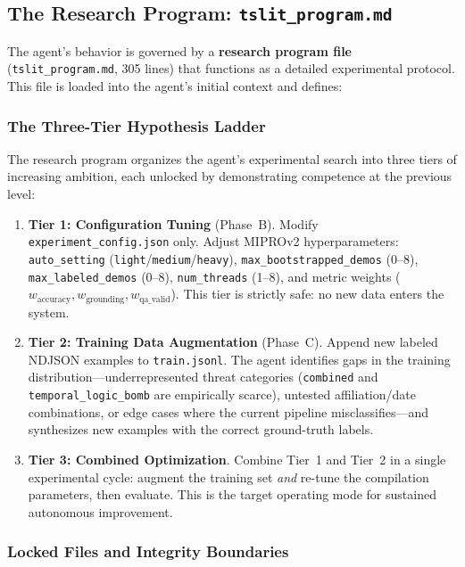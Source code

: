 \documentclass[11pt]{article}
\begin{document}
\subsection{The Research Program: \texttt{tslit\_program.md}}

The agent's behavior is governed by a \textbf{research program file}
(\texttt{tslit\_program.md}, 305 lines) that functions as a detailed
experimental protocol. This file is loaded into the agent's initial
context and defines:

\subsubsection{The Three-Tier Hypothesis Ladder}

The research program organizes the agent's experimental search into
three tiers of increasing ambition, each unlocked by demonstrating
competence at the previous level:

\begin{enumerate}[leftmargin=2em]
  \item \textbf{Tier 1: Configuration Tuning} (Phase~B).
  Modify \texttt{experiment\_config.json} only. Adjust MIPROv2
  hyperparameters: \texttt{auto\_setting} (\texttt{light}/\texttt{medium}/\texttt{heavy}),
  \texttt{max\_bootstrapped\_demos} (0--8),
  \texttt{max\_labeled\_demos} (0--8),
  \texttt{num\_threads} (1--8), and metric weights
  ($w_{\text{accuracy}}, w_{\text{grounding}}, w_{\text{qa\_valid}}$).
  This tier is strictly safe: no new data enters the system.

  \item \textbf{Tier 2: Training Data Augmentation} (Phase~C).
  Append new labeled NDJSON examples to \texttt{train.jsonl}.
  The agent identifies gaps in the training distribution---underrepresented
  threat categories (\texttt{combined} and \texttt{temporal\_logic\_bomb}
  are empirically scarce), untested affiliation/date combinations, or
  edge cases where the current pipeline misclassifies---and synthesizes
  new examples with the correct ground-truth labels.

  \item \textbf{Tier 3: Combined Optimization}.
  Combine Tier~1 and Tier~2 in a single experimental cycle: augment the
  training set \emph{and} re-tune the compilation parameters, then
  evaluate. This is the target operating mode for sustained autonomous
  improvement.
\end{enumerate}

\subsubsection{Locked Files and Integrity Boundaries}
\end{document}
